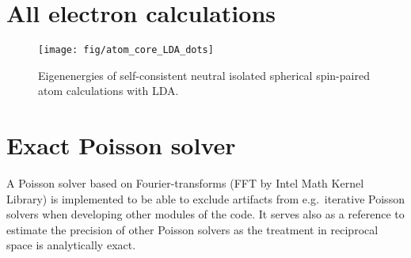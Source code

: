 \documentclass[oribibl]{llncs}
\newcommand{\ttt}[1]{\texttt{#1}}
\begin{document}
\section{All electron calculations}\label{sec:all-electron}
%
\begin{figure}
  \begin{minipage}[c]{.990\textwidth}
	\texttt{[image: fig/atom\_core\_LDA\_dots]} %
  \end{minipage}\hfill
  \begin{minipage}[c]{.009\textwidth}
  \end{minipage}
  \label{fig:atom_core_levels}
  \caption{
	Eigenenergies of self-consistent neutral isolated spherical spin-paired atom calculations with LDA.
  }
\end{figure}
%
%

\section{Exact Poisson solver}
%
%
%
A Poisson solver based on Fourier-transforms (FFT by Intel Math Kernel Library)
is implemented to be able to exclude artifacts from e.g.~iterative Poisson solvers
when developing other modules of the code. 
It serves also as a reference to estimate the precision of other Poisson solvers
as the treatment in reciprocal space is analytically exact.
\end{document}
